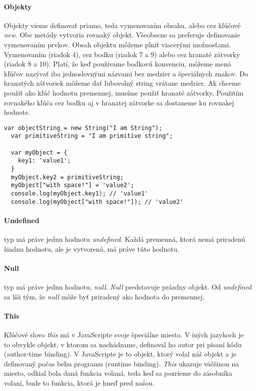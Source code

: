 \paragraph{Objekty}
Objekty vieme definovať priamo, teda vymenovaním obsahu, alebo cez kľúčové \emph{new}. Obe metódy vytvoria rovnaký objekt. Všeobecne sa preferuje definovanie vymenovaním prvkov.
Obsah objektu môžeme plniť viacerými možnosťami. Vymenovaním (riadok 4), cez bodku (riadok 7 a 9) alebo cez hranaté zátvorky (riadok 8 a 10). Platí, že keď používame bodkovú konvenciu, môžeme mená kľúčov nazývať iba jednoslovnými názvami bez medzier a špeciálnych znakov. Do hranatých zátvoriek môžeme dať ľubovolný string vrátane medzier. Ak chceme použiť ako kľúč hodnotu premennej, musíme použiť hranaté zátvorky. Použitím rovnakého kľúča cez bodku aj v hranatej zátvorke sa dostaneme ku rovnakej hodnote.

\begin{lstlisting}[caption=tvorba objektu]
  var objectString = new String("I am String");
  var primitiveString = "I am primitive string";

  var myObject = {
    key1: 'value1';
  }
  myObject.key2 = primitiveString;
  myObject["with space!"] = 'value2';
  console.log(myObject.key1); // 'value1'
  console.log(myObject["with space!"]); // 'value2'
\end{lstlisting}

\paragraph{Undefined} typ má práve jednu hodnotu \emph{undefined}. Každá premenná, ktorá nemá priradenú žiadnu hodnotu, ale je vytvorená, má práve túto hodnotu.

\paragraph{Null} typ má práve jednu hodnotu, \emph{null}. \emph{Null} predstavuje prázdny objekt. Od \emph{undefined} sa líši tým, že \emph{null} môže byť priradený ako hodnota do premennej.

\paragraph{This}%
Kľúčové slovo \emph{this} má v JavaScripte svoje špeciálne miesto. V iných jazykoch je to obvykle objekt, v ktorom sa nachádzame, definoval ho autor pri písaní kódu (author-time binding). V JavaScripte je to objekt, ktorý volal náš objekt a je definovaný počas behu programu (runtime binding). \emph{This} ukazuje väčšinou na miesto, odkial bola daná funkcia volaná, teda keď sa pozrieme do zásobníka volaní, bude to funkcia, ktorá je hneď pred našou.

